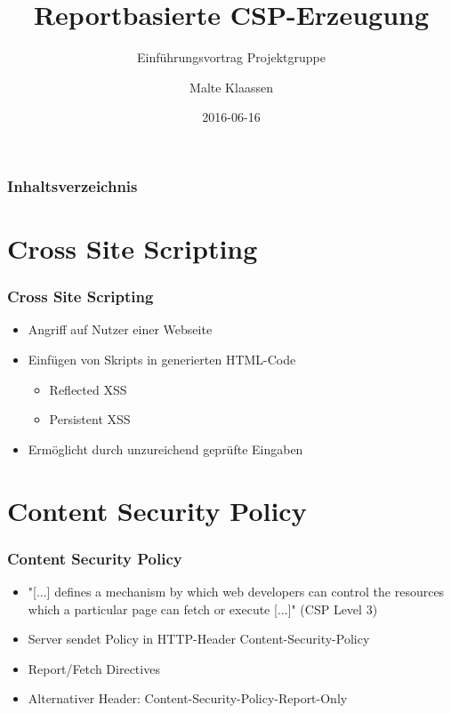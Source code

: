 \documentclass[handout]{beamer}
\title[Reportbasierte CSP Erzeugung]{Reportbasierte CSP-Erzeugung}
\subtitle{Einführungsvortrag Projektgruppe}
\author[Klaassen]{Malte Klaassen}
\date{2016-06-16}
\begin{document}
\begin{frame}%
\titlepage
\end{frame}

\begin{frame}%
	\frametitle{Inhaltsverzeichnis}
	\tableofcontents%
\end{frame}

\section{Cross Site Scripting}
\begin{frame}[c]
\frametitle{Cross Site Scripting}
\begin{itemize}
\item Angriff auf Nutzer einer Webseite
\item Einfügen von Skripts in generierten HTML-Code
\begin{itemize}
\item Reflected XSS
\item Persistent XSS
\end{itemize}
\item Ermöglicht durch unzureichend geprüfte Eingaben
\end{itemize}
\end{frame}

\section{Content Security Policy}
\begin{frame}[c]
\frametitle{Content Security Policy}
\begin{itemize}
\item "[...] defines a mechanism by which web developers can control the resources which a particular page can fetch or execute [...]" (CSP Level 3)
\item Server sendet Policy in HTTP-Header Content-Security-Policy
\item Report/Fetch Directives
\item Alternativer Header: Content-Security-Policy-Report-Only
\end{itemize}
\end{frame}
\end{document}
